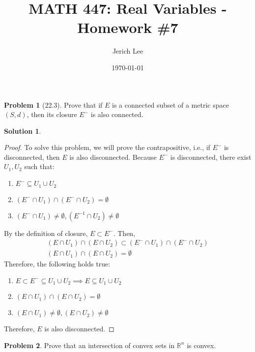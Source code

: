 \documentclass[12pt]{article}
\title{MATH 447: Real Variables - Homework \#7}
\author{Jerich Lee}
\date{\today}
\theoremstyle{definition} %
\newtheorem{solution}{Solution}
\newtheorem{problem}{Problem}
\theoremstyle{plain} %
\begin{document}
\maketitle

\begin{problem}[22.3]
Prove that if $E$ is a connected subset of a metric space $(S, d)$, then its closure $E^-$ is also connected.
\end{problem}
\begin{solution}
    \begin{proof}
        To solve this problem, we will prove the contrapositive, i.e., if $E^{-}$ is disconnected, then $E$ is also disconnected. Because $E^{-}$ is disconnected, there exist $U_1, U_2$ such that:
    \begin{enumerate}
        \item $E^{-}\subseteq U_1 \cup U_2$ 
        \item $(E^{-}\cap U_1)\cap (E^{-}\cap U_2)=\emptyset$
        \item $(E^{-}\cap U_1) \neq \emptyset, (E^{-1}\cap U_{2})\neq \emptyset$   
    \end{enumerate}  By the definition of closure, $E \subset E^{-}$. Then, 
    \begin{align}
        (E\cap U_1)\cap (E\cap U_2)\subset (E^{-}\cap U_1)\cap (E^{-}\cap U_2) \\[10pt] 
        (E\cap U_1)\cap (E\cap U_2)=\emptyset 
    \end{align}  Therefore, the following holds true:
    \begin{enumerate}
    \item $E \subset E^{-} \subseteq U_1 \cup U_2\implies E \subseteq U_1 \cup U_2$  
    \item $(E\cap U_1)\cap (E\cap U_2)=\emptyset$
    \item $(E\cap U_1)\neq \emptyset, (E\cap U_{2})\neq \emptyset$   
    \end{enumerate}
    Therefore, $E$ is also disconnected.
\end{proof}
\end{solution}
\begin{problem}
Prove that an intersection of convex sets in $\mathbb{R}^n$ is convex.
\end{problem}
\end{document}
